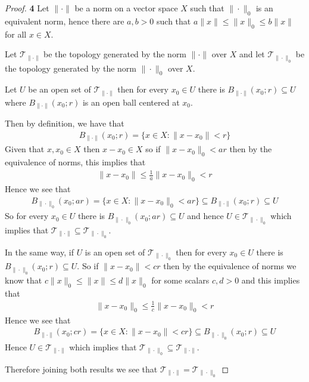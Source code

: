 \documentclass[11pt]{article}
\theoremstyle{definition}
\begin{document}
\begin{proof}{\textbf{4}}
    Let $\|\cdot\|$  be a norm on a vector space $X$ such that
    $\|\cdot\|_0$ is an equivalent norm, hence there are $a,b > 0$
    such that $a\|x\| \leq \|x\|_0 \leq b\|x\|$
    for all $x \in X$.
    
    Let $\mathcal{T}_{\|\cdot\|}$ be the topology generated by the norm
    $\|\cdot\|$ over $X$ and let $\mathcal{T}_{\|\cdot\|_0}$ be the topology
    generated by the norm $\|\cdot\|_0$ over $X$.

    Let $U$ be an open set of $\mathcal{T}_{\|\cdot\|}$ then for every $x_0 \in U$
    there is  $B_{\|\cdot\|}(x_0;r) \subseteq U$
    where $B_{\|\cdot\|}(x_0;r)$ is an open ball centered at $x_0$.

    Then by definition, we have that
    \begin{align*}
        B_{\|\cdot\|}(x_0;r) = \{x \in X: \|x - x_0\| < r\}
    \end{align*}
    Given that $x, x_0 \in X$ then $x - x_0 \in X$ so if $\|x - x_0\|_0 < ar$
    then by the equivalence of norms, this implies that
    \begin{align*}
        \|x - x_0\| \leq \frac{1}{a} \|x - x_0\|_0 < r
    \end{align*}
    Hence we see that
    \begin{align*}
        B_{\|\cdot\|_0}(x_0;ar) = \{x \in X: \|x - x_0\|_0 < ar\} \subseteq
        B_{\|\cdot\|}(x_0;r) \subseteq U
    \end{align*}
    So for every $x_0 \in U$ there is $B_{\|\cdot\|_0}(x_0;ar) \subseteq U$
    and hence $U \in \mathcal{T}_{\|\cdot\|_0}$ which implies that
    $\mathcal{T}_{\|\cdot\|} \subseteq\mathcal{T}_{\|\cdot\|_0}$.

    In the same way, if $U$ is an open set of $\mathcal{T}_{\|\cdot\|_0}$
    then for every $x_0 \in U$ there is $B_{\|\cdot\|_0}(x_0;r) \subseteq U$.
    So if $\|x - x_0\| < cr$ then by the equivalence of norms we know that
    $c\|x\|_0 \leq \|x\| \leq d\|x\|_0$ for some scalars $c,d > 0$ and
    this implies that
    \begin{align*}
        \|x - x_0\|_0 \leq \frac{1}{c} \|x - x_0\|_0 < r
    \end{align*}
    Hence we see that
    \begin{align*}
        B_{\|\cdot\|}(x_0;cr) = \{x \in X: \|x - x_0\| < cr\} \subseteq
        B_{\|\cdot\|_0}(x_0;r) \subseteq U
    \end{align*}
    Hence $U \in \mathcal{T}_{\|\cdot\|}$ which implies that
    $\mathcal{T}_{\|\cdot\|_0} \subseteq\mathcal{T}_{\|\cdot\|}$.

    Therefore joining both results we see that 
    $\mathcal{T}_{\|\cdot\|} = \mathcal{T}_{\|\cdot\|_0}$
\end{proof}
\end{document}
